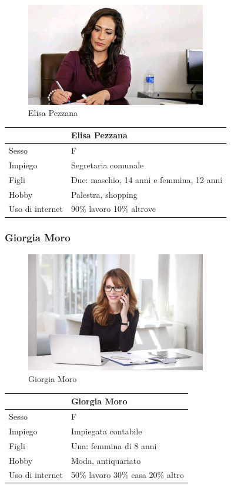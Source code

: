\documentclass[12pt,italian,]{report}
\begin{document}
\begin{figure}[h]
\centering
\includegraphics[width=0.7\textwidth,height=\textheight]{img/elisa.jpg}
\caption{Elisa Pezzana}
\end{figure}

\begin{longtable}[]{@{}ll@{}}
\toprule
& Elisa Pezzana\tabularnewline
\midrule
\endhead
Sesso & F\tabularnewline
Impiego & Segretaria comunale\tabularnewline
Figli & Due: maschio, 14 anni e femmina, 12 anni\tabularnewline
Hobby & Palestra, shopping\tabularnewline
Uso di internet & 90\% lavoro 10\% altrove\tabularnewline
\bottomrule
\end{longtable}

\hypertarget{giorgia-moro}{%
\subsubsection{Giorgia Moro}\label{giorgia-moro}}

\begin{figure}[h]
\centering
\includegraphics[width=0.7\textwidth,height=\textheight]{img/giorgia.jpg}
\caption{Giorgia Moro}
\end{figure}

\begin{longtable}[]{@{}ll@{}}
\toprule
& Giorgia Moro\tabularnewline
\midrule
\endhead
Sesso & F\tabularnewline
Impiego & Impiegata contabile\tabularnewline
Figli & Una: femmina di 8 anni\tabularnewline
Hobby & Moda, antiquariato\tabularnewline
Uso di internet & 50\% lavoro 30\% casa 20\% altro\tabularnewline
\bottomrule
\end{longtable}
\end{document}
